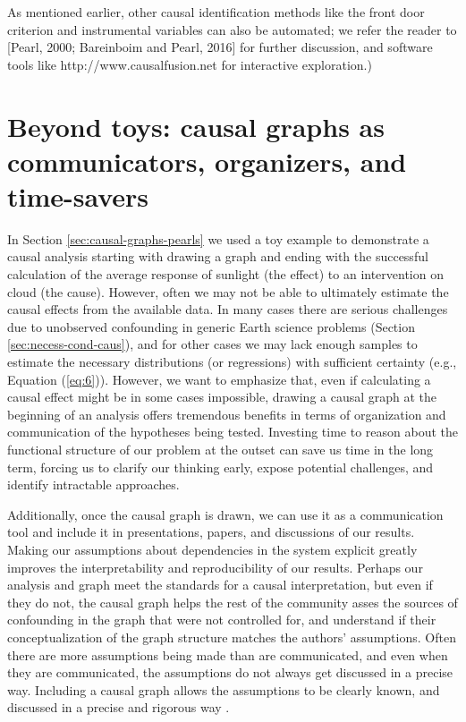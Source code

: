 \documentclass[12pt]{article}
\begin{document}
As mentioned earlier, other causal identification methods like the
front door criterion and instrumental variables can also be automated;
we refer the reader to [Pearl, 2000; Bareinboim and Pearl, 2016] for
further discussion, and software tools like
http://www.causalfusion.net for interactive exploration.)


\section{Beyond toys: causal graphs as communicators, organizers, and
  time-savers}\label{sec:causal-graphs-as}

In Section \ref{sec:causal-graphs-pearls} we used a toy example to
demonstrate a causal analysis starting with drawing a graph and ending
with the successful calculation of the average response of sunlight
(the effect) to an intervention on cloud (the cause). However, often
we may not be able to ultimately estimate the causal effects from the
available data. In many cases there are serious challenges due to
unobserved confounding in generic Earth science problems (Section
\ref{sec:necess-cond-caus}), and for other cases we may lack enough
samples to estimate the necessary distributions (or regressions) with
sufficient certainty (e.g., Equation (\ref{eq:6})). However, we want
to emphasize that, even if calculating a causal effect might be in
some cases impossible, drawing a causal graph at the beginning of an
analysis offers tremendous benefits in terms of organization and
communication of the hypotheses being tested. Investing time to reason
about the functional structure of our problem at the outset can save
us time in the long term, forcing us to clarify our thinking early,
expose potential challenges, and identify intractable approaches.

Additionally, once the causal graph is drawn, we can use it as a
communication tool and include it in presentations, papers, and
discussions of our results. Making our assumptions about dependencies
in the system explicit greatly improves the interpretability and
reproducibility of our results. Perhaps our analysis and graph meet
the standards for a causal interpretation, but even if they do not,
the causal graph helps the rest of the community asses the sources of
confounding in the graph that were not controlled for, and understand
if their conceptualization of the graph structure matches the authors'
assumptions. Often there are more assumptions being made than are
communicated, and even when they are communicated, the assumptions do
not always get discussed in a precise way. Including a causal graph
allows the assumptions to be clearly known, and discussed in a precise
and rigorous way \citep{hannart-da}.
\end{document}
